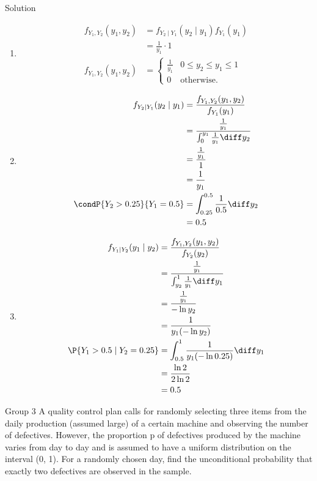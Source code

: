 \documentclass{article}
\theoremstyle{plain}
\theoremstyle{definition}
\theoremstyle{remark}
\begin{document}
\begin{solution}
    {Solution}
    \begin{enumerate}
        \item
        \begin{align*}
            f_{Y_1,Y_2}(y_1,y_2)
            &= f_{Y_2\mid Y_1}(y_2\mid y_1)f_{Y_1}(y_1) \\
            &= \frac{1}{y_1}\cdot 1 \\
            f_{Y_1,Y_2}(y_1,y_2)
            &={
            \begin{cases}
                \frac{1}{y_1} & 0\leq y_2\leq y_1\leq 1\\
                0 & \text{otherwise.}
            \end{cases}
        }
        \end{align*}
        \item
        \begin{align*}
            f_{Y_2\mid Y_1}(y_2\mid y_1)
            &= \frac{f_{Y_1,Y_2}(y_1,y_2)}{f_{Y_1}(y_1)} \\
            &= \frac{\frac{1}{y_1}}{\int_{0}^{y_1}\frac{1}{y_1}\diff y_2} \\
            &= \frac{\frac{1}{y_1}}{1}\\
            &= \frac{1}{y_1} \\
            \condP{Y_2>0.25}{Y_1=0.5}
            &= \int_{0.25}^{0.5}\frac{1}{0.5}\diff y_2 \\
            &= 0.5
        \end{align*}
        \item
        \begin{align*}
            f_{Y_1\mid Y_2}(y_1\mid y_2)
            &= \frac{f_{Y_1,Y_2}(y_1,y_2)}{f_{Y_2}(y_2)} \\
            &= \frac{\frac{1}{y_1}}{\int_{y_2}^{1}\frac{1}{y_1}\diff y_1} \\
            &= \frac{\frac{1}{y_1}}{-\ln y_2} \\
            &= \frac{1}{y_1(-\ln y_2)} \\
            \P{Y_1>0.5\mid Y_2=0.25}
            &= \int_{0.5}^{1}\frac{1}{y_1(-\ln 0.25)}\diff y_1 \\
            &= \frac{\ln 2}{2\ln 2} \\
            &= 0.5
        \end{align*}
    \end{enumerate}
\end{solution}

\begin{problem}
    {Group 3}
    A quality control plan calls for randomly selecting three items from the daily production (assumed large) of a certain machine and observing the number of defectives. However, the proportion p of defectives produced by the machine varies from day to day and is assumed to have a uniform distribution on the interval (0, 1). For a randomly chosen day, find the unconditional probability that exactly two defectives are observed in the sample.
\end{problem}
\end{document}
